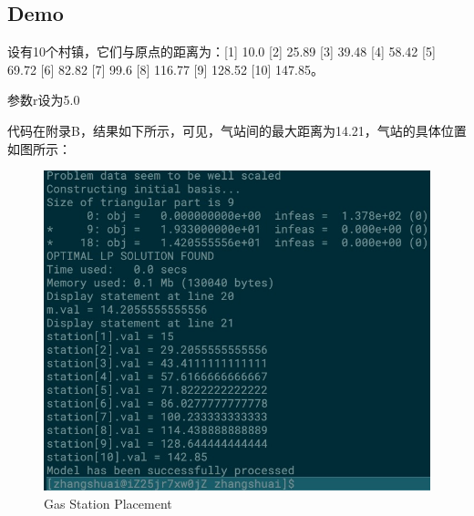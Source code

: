 \documentclass[UTF8,a4paper,12pt]{article}
\begin{document}
\begin{CJK}{UTF8}{gkai}
	\subsection{Demo}
		设有10个村镇，它们与原点的距离为：[1] 10.0 [2] 25.89 [3] 39.48 [4] 58.42 [5] 69.72 [6] 82.82 [7] 99.6 [8] 116.77 [9] 128.52 [10] 147.85。
		
		参数r设为5.0
		
		代码在附录B，结果如下所示，可见，气站间的最大距离为14.21，气站的具体位置如图所示：
		
		\begin{figure}[htb]
			\centering
			\includegraphics[scale=.7]{./gasres.png}
			\caption{Gas Station Placement}
		\end{figure}


	\end{CJK}	
\end{document}

